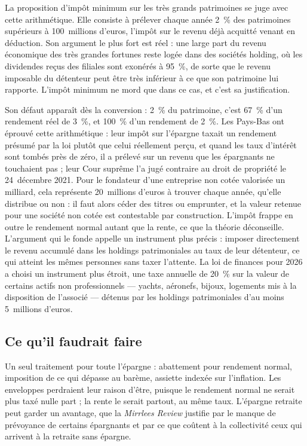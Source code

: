 \documentclass[11pt,a4paper]{article}
\begin{document}
La proposition d'impôt minimum sur les très grands patrimoines se juge avec cette arithmétique.
Elle consiste à prélever chaque année 2~\% des patrimoines supérieurs à 100~millions d'euros,
l'impôt sur le revenu déjà acquitté venant en déduction. Son argument le plus fort est réel : une
large part du revenu économique des très grandes fortunes reste logée dans des sociétés holding,
où les dividendes reçus des filiales sont exonérés à 95~\%, de sorte que le revenu imposable du
détenteur peut être très inférieur à ce que son patrimoine lui rapporte. L'impôt minimum ne mord
que dans ce cas, et c'est sa justification.

Son défaut apparaît dès la conversion : 2~\% du patrimoine, c'est 67~\% d'un rendement réel de 3~\%,
et 100~\% d'un rendement de 2~\%. Les Pays-Bas ont éprouvé cette arithmétique : leur impôt sur
l'épargne taxait un rendement présumé par la loi plutôt que celui réellement perçu, et quand les
taux d'intérêt sont tombés près de zéro, il a prélevé sur un revenu que les épargnants ne
touchaient pas ; leur Cour suprême l'a jugé contraire au droit de propriété le 24~décembre 2021. Pour le fondateur d'une entreprise non cotée valorisée un
milliard, cela représente 20~millions d'euros à trouver chaque année, qu'elle distribue ou non : il
faut alors céder des titres ou emprunter, et la valeur retenue pour une société non cotée est
contestable par construction. L'impôt frappe en outre le rendement normal autant que la rente, ce
que la théorie déconseille. L'argument qui le fonde appelle un instrument plus précis : imposer
directement le revenu accumulé dans les holdings patrimoniales au taux de leur détenteur, ce qui
atteint les mêmes personnes sans taxer l'attente. La loi de finances pour 2026 a choisi un
instrument plus étroit, une taxe annuelle de 20~\% sur la valeur de certains actifs non
professionnels --- yachts, aéronefs, bijoux, logements mis à la disposition de l'associé ---
détenus par les holdings patrimoniales d'au moins 5~millions d'euros.

\subsection{Ce qu'il faudrait faire}

Un seul traitement pour toute l'épargne : abattement pour rendement normal, imposition de ce qui
dépasse au barème, assiette indexée sur l'inflation. Les enveloppes perdraient leur raison d'être,
puisque le rendement normal ne serait plus taxé nulle part ; la rente le serait partout, au même
taux. L'épargne retraite peut garder un avantage, que la \emph{Mirrlees Review} justifie par le
manque de prévoyance de certains épargnants et par ce que coûtent à la collectivité ceux qui
arrivent à la retraite sans épargne.
\end{document}
